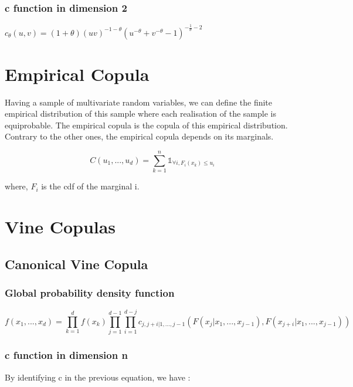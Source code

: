 \documentclass{article}
\begin{document}
	\subsubsection{c function in dimension 2}
	\begin{math}
		c_\theta (u,v) = (1+\theta)(u v)^{-1-\theta}(u^{-\theta}+v^{-\theta}-1)^{-\frac{1}{\theta}-2}
	\end{math}

	\section{Empirical Copula}
	Having a sample of multivariate random variables, we can define the finite empirical distribution of this sample where each realisation of the sample is equiprobable. The empirical copula is the copula of this empirical distribution. Contrary to the other ones, the empirical copula depends on its marginals.

	\begin{equation*}
	C(u_1,...,u_d) = \sum_{k=1}^n \mathds{1}_{\forall i, F_i(x_k)\leq u_i}
	\end{equation*}

	where, $F_i$ is the cdf of the marginal i.


	\section{Vine Copulas}

	\subsection{Canonical Vine Copula}

	\subsubsection{Global probability density function}

	\begin{equation*}
		f(x_1,...,x_d)= \prod_{k=1}^d f(x_k) \prod_{j=1}^{d-1} \prod_{i=1}^{d-j} c_{j,j+i|1,...,j-1}(F(x_j|x_1,...,x_{j-1}),F(x_{j+i}|x_1,...,x_{j-1}))
	\end{equation*}

	\subsubsection{c function in dimension n}
	By identifying c in the previous equation, we have :
\end{document}
